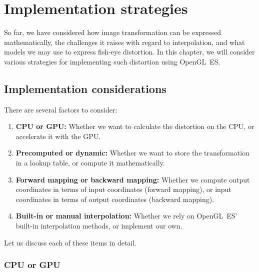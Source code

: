 \documentclass[english,12pt]{ifimaster}
\begin{document}



\chapter{Implementation strategies}
\label{chap:strategies}

So far, we have considered how image transformation can be expressed
mathematically, the challenges it raises with regard to interpolation,
and what models we may use to express fish-eye distortion. In this
chapter, we will consider various strategies for implementing such
distortion using OpenGL~ES.

\section{Implementation considerations}

There are several factors to consider:
\begin{enumerate}
\item \textbf{CPU or GPU:} Whether we want to calculate the
  distortion on the CPU, or accelerate it with the GPU.
\item \textbf{Precomputed or dynamic:} Whether we want to store the
  transformation in a lookup table, or compute it mathematically.
\item \textbf{Forward mapping or backward mapping:} Whether we compute
  output coordinates in terms of input coordinates (forward mapping),
  or input coordinates in terms of output coordinates (backward
  mapping).
\item \textbf{Built-in or manual interpolation:} Whether we rely on
  OpenGL~ES' built-in interpolation methods, or implement our own.
\end{enumerate}
Let us discuss each of these items in detail.

\subsection{CPU or GPU}
\end{document}
